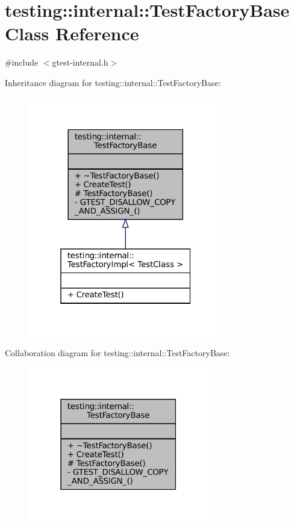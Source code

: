 \hypertarget{classtesting_1_1internal_1_1TestFactoryBase}{}\section{testing\+:\+:internal\+:\+:Test\+Factory\+Base Class Reference}
\label{classtesting_1_1internal_1_1TestFactoryBase}


{\ttfamily \#include $<$gtest-\/internal.\+h$>$}



Inheritance diagram for testing\+:\+:internal\+:\+:Test\+Factory\+Base\+:
\nopagebreak
\begin{figure}[H]
\begin{center}
\leavevmode
\includegraphics[width=241pt]{classtesting_1_1internal_1_1TestFactoryBase__inherit__graph}
\end{center}
\end{figure}


Collaboration diagram for testing\+:\+:internal\+:\+:Test\+Factory\+Base\+:
\nopagebreak
\begin{figure}[H]
\begin{center}
\leavevmode
\includegraphics[width=223pt]{classtesting_1_1internal_1_1TestFactoryBase__coll__graph}
\end{center}
\end{figure}
